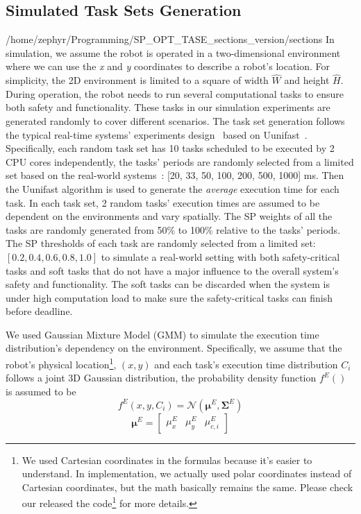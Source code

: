 
\subsection{Simulated Task Sets Generation}
/home/zephyr/Programming/SP_OPT_TASE_sections_version/sections
In simulation, we assume the robot is operated in a two-dimensional environment where we can use the \textit{x} and \textit{y} coordinates to describe a robot's location. 
For simplicity, the 2D environment is limited to a square of width $\hat{W}$ and height $\hat{H}$.
During operation, the robot needs to run several computational tasks to ensure both safety and functionality. These tasks in our simulation experiments are generated randomly to cover different scenarios. The task set generation follows the typical real-time systems' experiments design~\cite{Wang2023RTAS, Zhao2020AnOF} based on Uunifast~\cite{Davis2008EfficientES}.
Specifically, each random task set has 10 tasks scheduled to be executed by 2 CPU cores independently, the tasks' periods are randomly selected from a limited set based on the real-world systems~\cite{Percept21_RTSS, Kramer15benchmark}: [20, 33, 50, 100, 200, 500, 1000] ms. Then the Uunifast algorithm is used to generate the \textit{average} execution time for each task. 
In each task set, 2 random tasks' execution times are assumed to be dependent on the environments and vary spatially. The SP weights of all the tasks are randomly generated from 50\% to 100\% relative to the tasks' periods. The SP thresholds of each task are randomly selected from a limited set: $[0.2, 0.4, 0.6, 0.8, 1.0]$ to simulate a real-world setting with both safety-critical tasks and soft tasks that do not have a major influence to the overall system's safety and functionality. The soft tasks can be discarded when the system is under high computation load to make sure the safety-critical tasks can finish before deadline. 


We used Gaussian Mixture Model (GMM) to simulate the execution time distribution's dependency on the environment. Specifically, we assume that the robot's physical location\footnote{We used Cartesian coordinates in the formulas because it's easier to understand. In implementation, we actually used polar coordinates instead of Cartesian coordinates, but the math basically remains the same. Please check our released the code\footnote{\githubLink{}} for more details.}, $(x, y)$ and each task's execution time distribution $C_i$ follows a joint 3D Gaussian distribution, the probability density function $f^{E}()$ is assumed to be
\begin{equation}
    f^{E}(x, y, C_i) =\mathcal{N}(\boldsymbol{\mu}^E, \boldsymbol{\Sigma}^E)
    \label{eq: pdf_gmm}
\end{equation}
\begin{equation}
    \boldsymbol{\mu}^E = \begin{bmatrix}
        \mu^E_x & \mu^E_y & \mu^E_{c,i}
    \end{bmatrix}
\end{equation}

